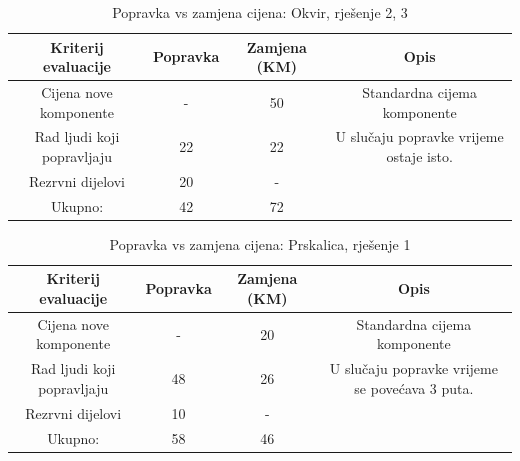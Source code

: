 \documentclass[12pt]{article}
\begin{document}
\begin{landscape}
    \vspace*{\fill}
\begin{table}[htbp]
  \centering
  \footnotesize
  \caption{Popravka vs zamjena cijena: Okvir, rješenje 2, 3}
    \begin{tabular}{cccc}
    \toprule
    Kriterij evaluacije & Popravka & Zamjena (KM) & Opis \\
    \midrule
     Cijena nove komponente & -     & 50    & \multicolumn{1}{p{23.215em}}{Standardna \newline{}cijema\newline{} komponente} \\
    \midrule
    Rad ljudi koji popravljaju & 22    & 22    & \multicolumn{1}{p{23.215em}}{U slučaju popravke vrijeme ostaje isto. } \\
    \midrule
    Rezrvni dijelovi & 20    & -     &  \\
    \midrule
    Ukupno: & 42    & 72    &  \\
    \bottomrule
    \end{tabular}%
  \label{tab:popravka7}%
\end{table}%

\begin{table}[htbp]
  \centering
    \footnotesize
  \caption{Popravka vs zamjena cijena: Prskalica, rješenje 1}
    \begin{tabular}{cccc}
    \toprule
    Kriterij evaluacije & Popravka & Zamjena (KM) & Opis \\
    \midrule
     Cijena nove komponente & -     & 20    & \multicolumn{1}{p{19.57em}}{Standardna \newline{}cijema\newline{} komponente} \\
    \midrule
    Rad ljudi koji popravljaju & 48    & 26    & \multicolumn{1}{p{19.57em}}{ U slučaju popravke vrijeme se povećava 3 puta. } \\
    \midrule
    Rezrvni dijelovi & 10    & -     &  \\
    \midrule
    Ukupno: & 58    & 46    &  \\
    \bottomrule
    \end{tabular}%
  \label{tab:popravka8}%
\end{table}%

    \vspace*{\fill}
\end{landscape}
\end{document}
